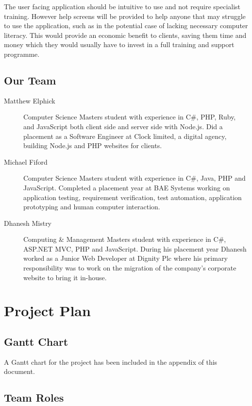 \documentclass{article}
\begin{document}
\par

The user facing application should be intuitive to use and not require specialist training. However help screens will be provided to help anyone that may struggle to use the application, such as in the potential case of lacking necessary computer literacy. This would provide an economic benefit to clients, saving them time and money which they would usually have to invest in a full training and support programme.

\subsection{Our Team}
\label{section:team}

\begin{description} %
\item[Matthew Elphick] Computer Science Masters student with experience in C\#, PHP, Ruby, and JavaScript both client side and server side with Node.js. Did a placement as a Software Engineer at Clock limited, a digital agency, building Node.js and PHP websites for clients.
\item[Michael Fiford] Computer Science Masters student with experience in C\#, Java, PHP and JavaScript. Completed a placement year at BAE Systems working on application testing, requirement verification, test automation, application prototyping and human computer interaction.
\item[Dhanesh Mistry] Computing \& Management Masters student with experience in C\#, ASP.NET MVC, PHP and JavaScript. During his placement year Dhanesh worked as a Junior Web Developer at Dignity Plc where his primary responsibility was to work on the migration of the company's corporate website to bring it in-house.
\end{description}

\section{Project Plan}

\subsection{Gantt Chart}
A Gantt chart for the project has been included in the appendix of this document.
\subsection{Team Roles}
\end{document}
